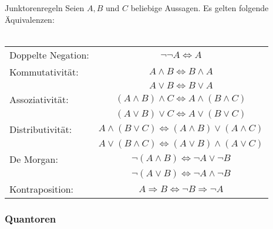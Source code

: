 \begin{lemma}{Junktorenregeln}
 Seien $A,B$ und $C$ beliebige Aussagen. Es gelten folgende Äquivalenzen:\\ \\
 \begin{tabular}{lc}
    Doppelte Negation:  & $\neg\neg A\Leftrightarrow A$\\
    Kommutativität:     & $ A\wedge B\Leftrightarrow B\wedge A$\\
                        & $A\vee B\Leftrightarrow B\vee A$\\
    Assoziativität:     & $(A\wedge B)\wedge C\Leftrightarrow A\wedge (B\wedge C)$\\
                        & $(A\vee B)\vee C\Leftrightarrow A\vee (B\vee C)$\\
    Distributivität:    & $A\wedge (B\vee C)\Leftrightarrow (A\wedge B)\vee (A\wedge C)$\\
                        & $A\vee (B\wedge C)\Leftrightarrow (A\vee B)\wedge (A\vee C)$\\
    De Morgan:          & $\neg(A\wedge B)\Leftrightarrow\neg A\vee\neg B$\\
                        & $\neg(A\vee B)\Leftrightarrow \neg A\wedge\neg B$\\
    Kontraposition:     & $A\Rightarrow B\Leftrightarrow \neg B\Rightarrow \neg A$
 \end{tabular}
\end{lemma}


\subsubsection{Quantoren}
\begin{comment}
Quantoren sind Symbole  anhand derer wir aus Prädikaten neue Prädikate oder Aussagen gewinnen
können. Wir betrachten das Beispiel des Prädikates
\[
 A(x):=\text{``}x\text{ ist eine Primzahl und } x\text{ ist ein Teiler von }24\text{''}
\]
und die Aussage
\[
 B:= ``\text{es gibt eine Primzahl welche ein Teiler von }24\text{ ist''}
\]
mit anderen Worten,
\[
 B:=``\text{es \textbf{existiert} ein }x\text{ mit }A(x)\text{''}.
\]
Wir sagen, dass $B$ aus $A(x)$ durch existenzielle Quantifizierung über $x$ entsteht.

Andererseits können wir aus dem Prädikat $A(x)$ aber auch die (offensichtlich falsche) Aussage
\[
 C:=\text{``alle Zahlen sind Primzahlen und ein Teiler von }24\text{''}
\]
konstruieren. Diese ist gleichbedeutend mit
\[
 C:=\text{''\textbf{alle} Zahlen }x\text{ erfüllen }A(x).
\]
Wir sagen, dass $C$ aus $A(x)$ durch universelle Quantifizierung entsteht\footnote{Obwohl in den Aussagen $B$ und
$C$ formal die Variable $x$ vorkommt, steht sie nicht als Platzhalter für ein einzusetzendes Objekt, sondern
``läuft'' über die Gesamtheit aller möglichen Objekte. Wir sagen, dass die Variable nicht frei sondern durch
einen Quantor gebunden ist.}.
\end{comment}


